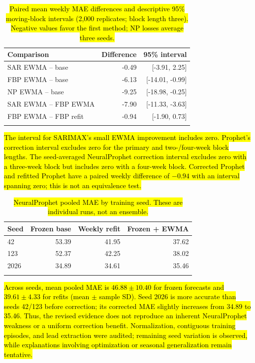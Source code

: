 \documentclass[pdflatex,sn-basic,Numbered]{sn-jnl}
\newcommand{\rev}[1]{\hl{#1}}
\begin{document}
\begin{table}[htbp]
\caption{\rev{Paired mean weekly MAE differences and descriptive 95\% moving-block intervals (2,000 replicates; block length three). Negative values favor the first method; NP losses average three seeds.}}
\label{tab:paired}
\begingroup\small\setlength{\tabcolsep}{4pt}
\begin{tabularx}{\linewidth}{@{}Xrr@{}}
\toprule
Comparison & Difference & 95\% interval \\
\midrule
SAR EWMA -- base & -0.49 & [-3.91, 2.25] \\
FBP EWMA -- base & -6.13 & [-14.01, -0.99] \\
NP EWMA -- base & -9.25 & [-18.98, -0.25] \\
SAR EWMA -- FBP EWMA & -7.90 & [-11.33, -3.63] \\
FBP EWMA -- FBP refit & -0.94 & [-1.90, 0.73] \\
\botrule
\end{tabularx}\endgroup
\end{table}

\rev{The interval for SARIMAX's small EWMA improvement includes zero. Prophet's correction interval excludes zero for the primary and two-/four-week block lengths. The seed-averaged NeuralProphet correction interval excludes zero with a three-week block but includes zero with a four-week block. Corrected Prophet and refitted Prophet have a paired weekly difference of $-0.94$ with an interval spanning zero; this is not an equivalence test.}

\begin{table}[htbp]
\caption{\rev{NeuralProphet pooled MAE by training seed. These are individual runs, not an ensemble.}}
\label{tab:seeds}
\begingroup\small\setlength{\tabcolsep}{4pt}
\begin{tabularx}{\linewidth}{@{}Xrrr@{}}
\toprule
Seed & Frozen base & Weekly refit & Frozen + EWMA \\
\midrule
42 & 53.39 & 41.95 & 37.62 \\
123 & 52.37 & 42.25 & 38.02 \\
2026 & 34.89 & 34.61 & 35.46 \\
\botrule
\end{tabularx}\endgroup
\end{table}

\rev{Across seeds, mean pooled MAE is $46.88\pm10.40$ for frozen forecasts and $39.61\pm4.33$ for refits (mean $\pm$ sample SD). Seed 2026 is more accurate than seeds 42/123 before correction; its corrected MAE slightly increases from 34.89 to 35.46. Thus, the revised evidence does not reproduce an inherent NeuralProphet weakness or a uniform correction benefit. Normalization, contiguous training episodes, and lead extraction were audited; remaining seed variation is observed, while explanations involving optimization or seasonal generalization remain tentative.}
\end{document}
